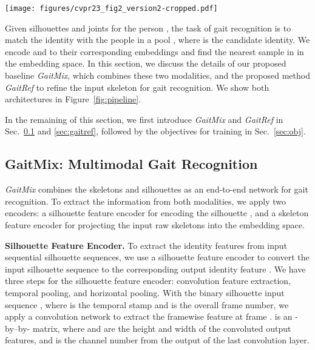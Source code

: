 \documentclass[10pt,twocolumn,letterpaper]{article}
\begin{document}
\begin{figure*}[t]
    \centering
    \texttt{[image: figures/cvpr23\_fig2\_version2-cropped.pdf]}
    \caption{Our proposed architecture for GaitRef and GaitMix. Trapezoids are trainable modules, and modules of the same color in the same model share the weight. Dashed lines are the operation of feature copying.  and  are the input silhouettes and skeletons.  represents silhouette features, while  and  represent skeleton features from input and refined skeletons, respectively. }
    \label{fig:pipeline}
\end{figure*}


Given silhouettes  and joints  for the person , the task of gait recognition is to match the identity with the people in a pool , where  is the candidate identity. We encode  and  to their corresponding embeddings and find the nearest sample in  in the embedding space. In this section, we discuss the details of our proposed baseline \textit{GaitMix}, which combines these two modalities, and the proposed method \textit{GaitRef} to refine the input skeleton for gait recognition. We show both architectures in Figure~\ref{fig:pipeline}. 

In the remaining of this section, we first introduce \textit{GaitMix} and \textit{GaitRef} in Sec.~\ref{sec:gaitmix} and \ref{sec:gaitref}, followed by the objectives for training in Sec.~\ref{sec:obj}.


\subsection{{GaitMix}: Multimodal Gait Recognition}\label{sec:gaitmix}

\textit{GaitMix} combines the skeletons and silhouettes as an end-to-end network for gait recognition. To extract the information from both modalities, we apply two encoders: a silhouette feature encoder for encoding the silhouette , and a skeleton feature encoder for projecting the input raw skeletons  into the embedding space.

\textbf{Silhouette Feature Encoder.} To extract the identity features from input sequential silhouette sequences, we use a silhouette feature encoder to convert the input silhouette sequence  to the corresponding output identity feature . We have three steps for the silhouette feature encoder: convolution feature extraction, temporal pooling, and horizontal pooling. With the binary silhouette input sequence , where  is the temporal stamp and  is the overall frame number, we apply a convolution network to extract the framewise feature  at frame .  is an -by--by- matrix, where  and  are the height and width of the convoluted output features, and  is the channel number from the output of the last convolution layer.
\end{document}
